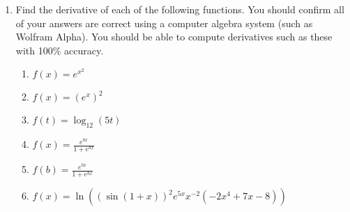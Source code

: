\documentclass{article}
\begin{document}
\begin{enumerate}
\begin{center}
\end{center}

\begin{center}
\end{center}
                  \item Find the derivative of each of the following functions. You should confirm all of your answers are correct using a computer algebra system (such as Wolfram Alpha). You should be able to compute derivatives such as these with 100\% accuracy.
                \begin{enumerate}
                    \item $\displaystyle f(x) = e^{x^2}$
                    \item $\displaystyle f(x) = (e^x)^2$
                    \item $\displaystyle f(t) = \log_{12}(5t)$
                    \item $\displaystyle f(x) = \frac{e^{bx}}{1+e^{bx}}$
                    \item $\displaystyle f(b) = \frac{e^{bx}}{1+e^{bx}}$
                    \item $\displaystyle f(x) = \ln{\left(\left(\sin{(1+x)}\right)^2e^{5x}x^{-2}(-2x^4+7x-8)\right)}$
                    

\end{enumerate}
\end{enumerate}
\end{document}
